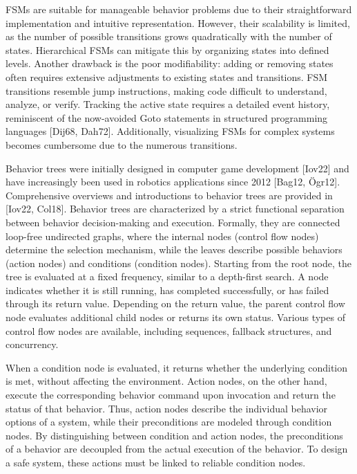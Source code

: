 FSMs are suitable for manageable behavior problems due to their straightforward implementation and intuitive representation.
However, their scalability is limited, as the number of possible transitions grows quadratically with the number of states.
Hierarchical FSMs can mitigate this by organizing states into defined levels.
Another drawback is the poor modifiability: adding or removing states often requires extensive adjustments to existing states and transitions.
FSM transitions resemble jump instructions, making code difficult to understand, analyze, or verify.
Tracking the active state requires a detailed event history, reminiscent of the now-avoided Goto statements in structured programming languages [Dij68, Dah72].
Additionally, visualizing FSMs for complex systems becomes cumbersome due to the numerous transitions.

Behavior trees were initially designed in computer game development [Iov22] and have increasingly been used in robotics applications since 2012 [Bag12, Ögr12].
Comprehensive overviews and introductions to behavior trees are provided in [Iov22, Col18].
Behavior trees are characterized by a strict functional separation between behavior decision-making and execution.
Formally, they are connected loop-free undirected graphs, where the internal nodes (control flow nodes) determine the selection mechanism, while the leaves describe possible behaviors (action nodes) and conditions (condition nodes).
Starting from the root node, the tree is evaluated at a fixed frequency, similar to a depth-first search.
A node indicates whether it is still running, has completed successfully, or has failed through its return value.
Depending on the return value, the parent control flow node evaluates additional child nodes or returns its own status.
Various types of control flow nodes are available, including sequences, fallback structures, and concurrency.

When a condition node is evaluated, it returns whether the underlying condition is met, without affecting the environment.
Action nodes, on the other hand, execute the corresponding behavior command upon invocation and return the status of that behavior.
Thus, action nodes describe the individual behavior options of a system, while their preconditions are modeled through condition nodes.
By distinguishing between condition and action nodes, the preconditions of a behavior are decoupled from the actual execution of the behavior.
To design a safe system, these actions must be linked to reliable condition nodes.

